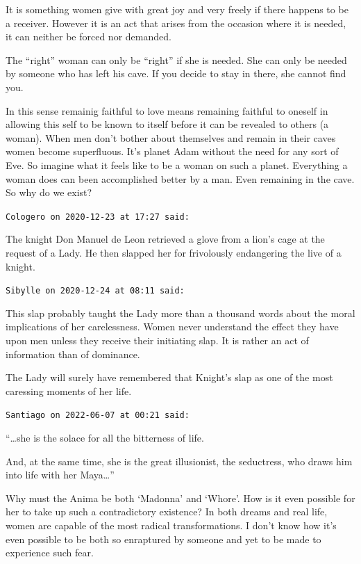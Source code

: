 \begin{footnotesize}
\begin{sffamily}
It is something women give with great joy and very freely if there happens to be a receiver. However it is an act that arises from the occasion where it is needed, it can neither be forced nor demanded.

The “right” woman can only be “right” if she is needed. She can only be needed by someone who has left his cave. If you decide to stay in there, she cannot find you.

In this sense remainig faithful to love means remaining faithful to oneself in allowing this self to be known to itself before it can be revealed to others (a woman). When men don't bother about themselves and remain in their caves women become superfluous. It's planet Adam without the need for any sort of Eve. So imagine what it feels like to be a woman on such a planet. Everything a woman does can been accomplished better by a man. Even remaining in the cave. So why do we exist?


\hfill

\texttt{Cologero on 2020-12-23 at 17:27 said: }

The knight Don Manuel de Leon retrieved a glove from a lion's cage at the request of a Lady. He then slapped her for frivolously endangering the live of a knight.


\hfill

\texttt{Sibylle on 2020-12-24 at 08:11 said: }

This slap probably taught the Lady more than a thousand words about the moral implications of her carelessness. Women never understand the effect they have upon men unless they receive their initiating slap. It is rather an act of information than of dominance.

The Lady will surely have remembered that Knight's slap as one of the most caressing moments of her life.


\hfill

\texttt{Santiago on 2022-06-07 at 00:21 said: }

“…she is the solace for all the bitterness of life.

And, at the same time, she is the great illusionist, the seductress, who draws him into life with her Maya…”

Why must the Anima be both `Madonna' and `Whore'. How is it even possible for her to take up such a contradictory existence? In both dreams and real life, women are capable of the most radical transformations. I don't know how it's even possible to be both so enraptured by someone and yet to be made to experience such fear.


\end{sffamily}
\end{footnotesize}
